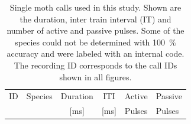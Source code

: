 \documentclass[12pt,a4paper]{article}
\newcommand{\percent}[1]{#1~$\%$}
\begin{document}
\begin{table}[h]
	\centering
	\caption{Single moth calls used in this study. Shown are the duration, inter train interval (IT) and number of active and passive pulses. Some of the species could not be determined with \percent{100} accuracy and were labeled with an internal code. The recording ID corresponds to the call IDs shown in all figures.}
	\setlength{\tabcolsep}{6pt} %
	\renewcommand{\arraystretch}{1.5} %
	\label{tab:SC}
	\begin{tabular}{llcccc}
		\rowcolor[HTML]{EFEFEF} 
		ID & {\color[HTML]{000000} Species}     & \multicolumn{1}{c}{\cellcolor[HTML]{EFEFEF}Duration } & \multicolumn{1}{c}{\cellcolor[HTML]{EFEFEF}ITI} & \multicolumn{1}{l}{\cellcolor[HTML]{EFEFEF}Active} & \multicolumn{1}{l}{\cellcolor[HTML]{EFEFEF}Passive} \\
		\rowcolor[HTML]{EFEFEF}
		& & \multicolumn{1}{c}{\cellcolor[HTML]{EFEFEF}[ms]} & \multicolumn{1}{c}{\cellcolor[HTML]{EFEFEF}[ms]} & \multicolumn{1}{l}{\cellcolor[HTML]{EFEFEF}Pulses} &
		\multicolumn{1}{l}{\cellcolor[HTML]{EFEFEF}Pulses} \\ \hline
		

\end{tabular}
\end{table}
\end{document}
